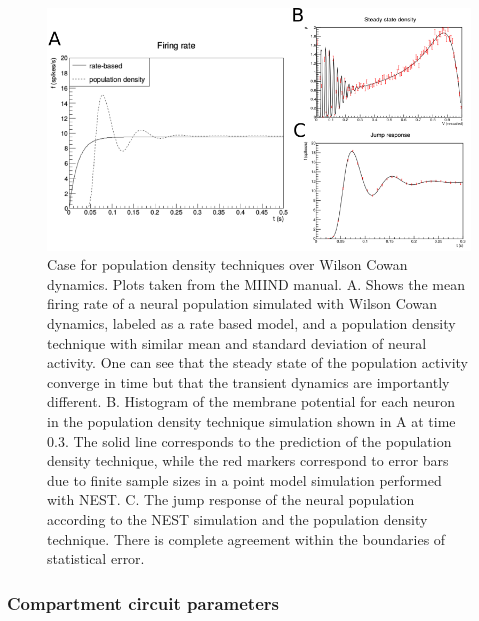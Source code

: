 \documentclass[10pt]{article}
\begin{document}
\begin{figure}[h!]
  \begin{center}
    \includegraphics[width=0.70\columnwidth]{figures/case_for_pdt1/case_for_pdt1}
    \caption{{\label{pdt_case} Case for population density techniques
        over Wilson Cowan dynamics. Plots taken from the MIIND manual.
        A. Shows the mean firing rate of a neural population simulated
        with Wilson Cowan dynamics, labeled as a rate based model, and
        a population density technique with similar mean and standard
        deviation of neural activity. One can see that the steady
        state of the population activity converge in time but that the
        transient dynamics are importantly different. B. Histogram of
        the membrane potential for each neuron in the population
        density technique simulation shown in A at time 0.3. The solid
        line corresponds to the prediction of the population density
        technique, while the red markers correspond to error bars due
        to finite sample sizes in a point model simulation performed
        with NEST. C. The jump response of the neural population
        according to the NEST simulation and the population density
        technique. There is complete agreement within the boundaries
        of statistical error.%
      }}
  \end{center}
\end{figure}

\subsubsection{Compartment circuit
  parameters}\label{compartment-circuit-parameters}
\end{document}
